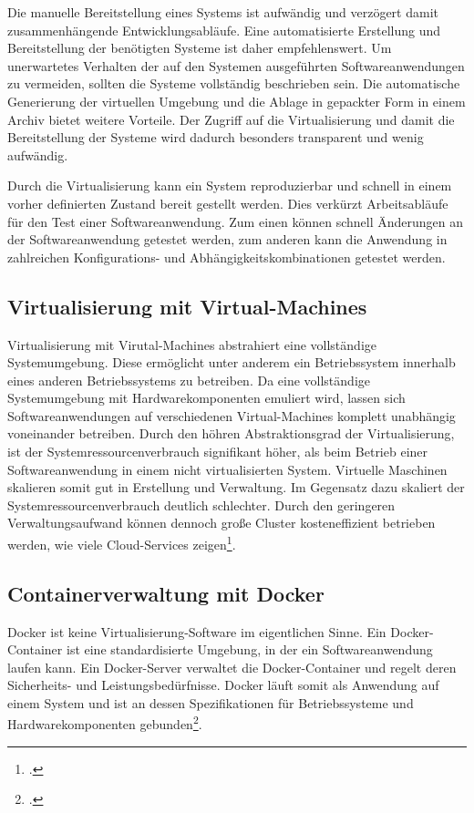 Die manuelle Bereitstellung eines Systems ist aufwändig und verzögert damit zusammenhängende Entwicklungsabläufe. Eine automatisierte Erstellung und Bereitstellung der benötigten Systeme ist daher empfehlenswert. Um unerwartetes Verhalten 
der auf den Systemen ausgeführten Softwareanwendungen zu vermeiden, sollten die Systeme vollständig beschrieben sein. Die automatische Generierung der virtuellen Umgebung und die Ablage in gepackter Form in einem Archiv bietet weitere Vorteile. Der Zugriff auf die Virtualisierung und damit die Bereitstellung der Systeme wird dadurch besonders transparent 
und wenig aufwändig.

Durch die Virtualisierung kann ein System reproduzierbar und schnell in einem vorher definierten Zustand bereit gestellt werden. Dies verkürzt Arbeitsabläufe für den Test einer Softwareanwendung. Zum einen können schnell Änderungen an der Softwareanwendung getestet werden, zum anderen kann die Anwendung in zahlreichen Konfigurations- und Abhängigkeitskombinationen getestet werden.

\subsection{Virtualisierung mit Virtual-Machines}

Virtualisierung mit Virutal-Machines abstrahiert eine vollständige Systemumgebung. Diese ermöglicht unter anderem ein Betriebssystem innerhalb eines anderen Betriebssystems zu betreiben. Da eine vollständige Systemumgebung mit Hardwarekomponenten emuliert wird, lassen sich Softwareanwendungen auf verschiedenen Virtual-Machines komplett unabhängig voneinander betreiben.
Durch den höhren Abstraktionsgrad der Virtualisierung, ist der Systemressourcenverbrauch signifikant höher, als beim Betrieb einer Softwareanwendung in einem nicht virtualisierten System. Virtuelle Maschinen skalieren somit gut in Erstellung und Verwaltung. Im Gegensatz dazu skaliert der Systemressourcenverbrauch deutlich schlechter. Durch den geringeren Verwaltungsaufwand können dennoch große Cluster kosteneffizient betrieben werden, wie viele Cloud-Services zeigen\footcite[vgl.][]{a-cloud-guru-cost}.

\subsection{Containerverwaltung mit Docker}

Docker ist keine Virtualisierung-Software im eigentlichen Sinne. Ein Docker-Container ist eine standardisierte Umgebung, in der ein Softwareanwendung laufen kann. Ein Docker-Server verwaltet die Docker-Container und regelt deren Sicherheits- und Leistungsbedürfnisse. Docker läuft somit als Anwendung auf einem System und ist an dessen Spezifikationen für Betriebssysteme und Hardwarekomponenten gebunden\footcite[vgl.][Kap. Why are containers important]{learn-docker}.

